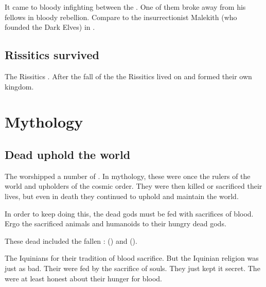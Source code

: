 It came to bloody infighting between the \Ortaican{} \raebari. 
One of them broke away from his fellows in bloody rebellion. 
Compare to the insurrectionist Malekith (who founded the Dark Elves) in \cite{RPG:Warhammer:DarkElves}. 





\subsection{Rissitics survived}
The Rissitics . 
After the fall of the \bacconate{} the Rissitics lived on and formed their own kingdom. 









\section{Mythology}









\subsection{Dead \dragons uphold the world}
The \Ortaicans worshipped a number of \dragons. 
In mythology, these \dragons were once the rulers of the world and upholders of the cosmic order. 
They were then killed or sacrificed their lives, but even in death they continued to uphold and maintain the world. 

In order to keep doing this, the dead \dragon gods must be fed with sacrifices of blood. 
Ergo the \Ortaicans sacrificed animals and humanoids to their hungry dead gods. 

These dead \dragons included the fallen \Nechsains: 
 (\Sethicus) and  (\Nexagglachel). 

The Iquinians  for their tradition of blood sacrifice. 
But the Iquinian religion {was just as bad}. 
Their \sephiroth were fed by the sacrifice of souls.
They just kept it secret. 
The \Ortaicans were at least honest about their hunger for blood. 

